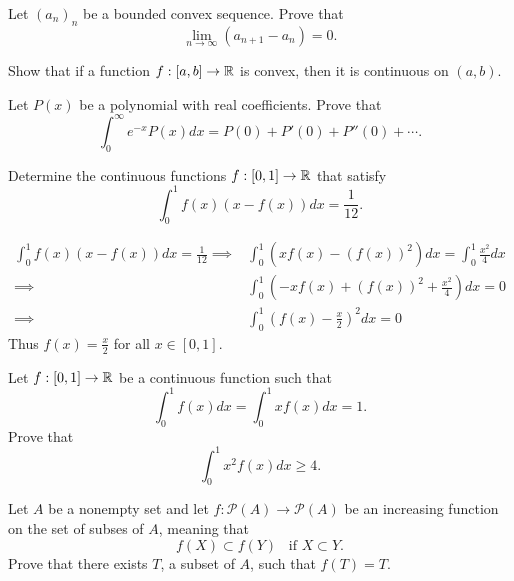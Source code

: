 \question Let $(a_n)_n$ be a bounded convex sequence. Prove that $$\lim_{n\to\infty}{(a_{n+1}-a_n)}=0.$$

\question[P\&B, 428] Show that if a function $f:[a,b]\to\mathbb{R}$ is convex, then it is continuous on $(a,b)$.

\question[P\&B, 464] Let $P(x)$ be a polynomial with real coefficients. Prove that
$$\int_{0}^{\infty}{e^{-x}P(x)dx}=P(0)+P'(0)+P''(0)+\cdots.$$

\question[P\&B, 473] Determine the continuous functions $f:[0,1]\to\mathbb{R}$ that satisfy
$$\int_{0}^{1}{f(x)(x-f(x))dx}=\frac{1}{12}.$$

\begin{solution}
    \begin{align*}
        \int_{0}^{1}{f(x)(x-f(x))dx}=\frac{1}{12}\implies&\int_{0}^{1}{(xf(x)-(f(x))^2)dx}=\int_{0}^{1}{\frac{x^2}{4}dx}\\
        \implies&\int_{0}^{1}{\left(-xf(x)+(f(x))^2+\frac{x^2}{4}\right)dx}=0\\
        \implies&\int_{0}^{1}{\left(f(x)-\frac{x}{2}\right)^2dx}=0
    \end{align*}
    Thus $f(x)=\frac{x}{2}$ for all $x\in[0,1]$.
\end{solution}

\question[P\&B, 475] Let $f:[0,1]\to\mathbb{R}$ be a continuous function such that
$$\int_{0}^{1}{f(x)dx}=\int_{0}^{1}{xf(x)dx}=1.$$
Prove that
$$\int_{0}^{1}{x^2f(x)dx}\geq 4.$$

\question Let $A$ be a nonempty set and let $f:\mathcal{P}(A)\to\mathcal{P}(A)$ be an increasing function on the set of subses of $A$, meaning that
$$f(X)\subset f(Y)\,\,\,\,\,\text{if }X\subset Y.$$
Prove that there exists $T$, a subset of $A$, such that $f(T)=T$.